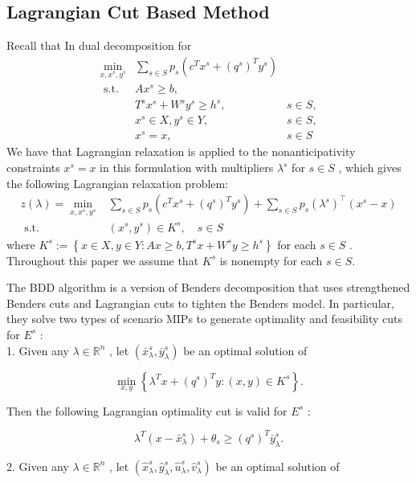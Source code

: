 \documentclass{article}
\theoremstyle{plain}
\theoremstyle{definition}
\begin{document}
\subsection{Lagrangian Cut Based Method}

Recall that In dual decomposition for
$$
\begin{array}{lll}
\min _{x, x^{s}, y^{s}} & \sum_{s \in S} p_{s}\left(c^{T} x^{s}+\left(q^{s}\right)^{T} y^{s}\right) \\
\text { s.t. } & A x^{s} \geq b, & \\
& T^{s} x^{s}+W^{s} y^{s} \geq h^{s}, & s \in S, \\
& x^{s} \in X, y^{s} \in Y, & s \in S, \\
& x^{s}=x, & s \in S
\end{array}
$$
We have that Lagrangian relaxation is applied to the nonanticipativity constraints  $x^{s}=x$  in this formulation with multipliers  $\lambda^{s}$  for  $s \in S$ , which gives the following Lagrangian relaxation problem:
$$
\begin{aligned}
z(\lambda)=\min _{x, x^{s}, y^{s}} & \sum_{s \in S} p_{s}\left(c^{T} x^{s}+\left(q^{s}\right)^{T} y^{s}\right)+\sum_{s \in S} p_{s}\left(\lambda^{s}\right)^{\top}\left(x^{s}-x\right) \\
\text { s.t. } &\left(x^{s}, y^{s}\right) \in K^{s}, \quad s \in S
\end{aligned}
$$
where  $K^{s}:=\left\{x \in X, y \in Y: A x \geq b, T^{s} x+W^{s} y \geq h^{s}\right\}$  for each  $s \in S$ . Throughout this paper we assume that  $K^{s}$  is nonempty for each  $s \in S$. 

The BDD algorithm is a version of Benders decomposition that uses strengthened Benders cuts and Lagrangian cuts to tighten the Benders model. In particular, they solve two types of scenario MIPs to generate optimality and feasibility cuts for  $E^{s}$  :\\

1. Given any  $\lambda \in \mathbb{R}^{n}$ , let  $\left(\bar{x}_{\lambda}^{s}, \bar{y}_{\lambda}^{s}\right) $ be an optimal solution of

$$\min _{x, y}\left\{\lambda^{T} x+\left(q^{s}\right)^{T} y:(x, y) \in K^{s}\right\} .$$

Then the following Lagrangian optimality cut is valid for  $E^{s}$  :

$$\lambda^{T}\left(x-\bar{x}_{\lambda}^{s}\right)+\theta_{s} \geq\left(q^{s}\right)^{T} \bar{y}_{\lambda}^{s} .$$

2. Given any  $\lambda \in \mathbb{R}^{n}$ , let  $\left(\hat{x}_{\lambda}^{s}, \hat{y}_{\lambda}^{s}, \hat{u}_{\lambda}^{s}, \hat{v}_{\lambda}^{s}\right)$  be an optimal solution of
\end{document}
